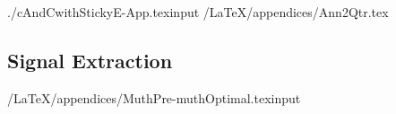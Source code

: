 \documentclass[titlepage]{\econtex}
\newcommand{\texname}{cAndCwithStickyE}
\begin{document}
\begin{verbatimwrite}{./cAndCwithStickyE-App.texinput}
\econtexRoot/LaTeX/appendices/Ann2Qtr.tex

\subsection{\cite{muthOptimal} Signal Extraction}\label{appendix:Muth}

\econtexRoot/LaTeX/appendices/MuthPre-muthOptimal.texinput

\end{verbatimwrite}


\small

\normalsize
\end{document}
